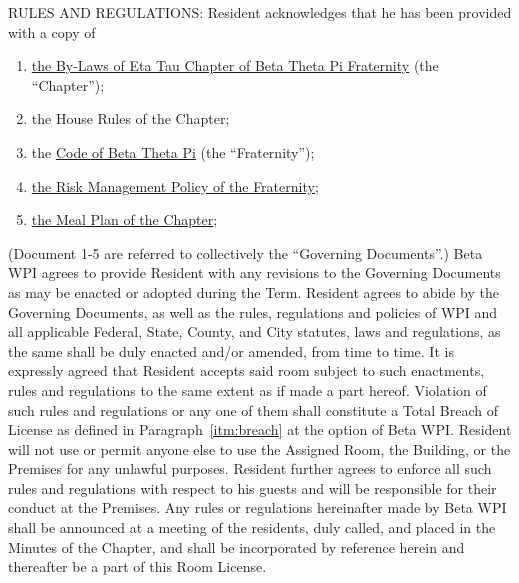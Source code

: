 \documentclass[legalpaper, 12pt]{article}
\begin{document}
\begin{enumerate}
RULES AND REGULATIONS\@: Resident acknowledges that he has been provided with a copy of 

\begin{enumerate}[label=\arabic*)]

        \item \href{https://docs.google.com/document/d/19zC4bDC3ZrdCWqLJ8Y0Z35mJEEDPLed1o6GGvX5XCGw/edit?usp=sharing} {the By-Laws of Eta Tau Chapter of Beta Theta Pi Fraternity} (the ``Chapter''); 

        \item the House Rules of the Chapter; 

        \item the \href{https://beta.org/wp-content/uploads/2020/08/Code-of-Beta-Theta-Pi_08.13.2020.pdf}{Code of Beta Theta Pi} (the ``Fraternity'');

        \item \href{https://beta.org/wp-content/uploads/2020/08/Beta-Theta-Pi-Risk-Management-Policy-August-2020.pdf}{the Risk Management Policy of the Fraternity};

        \item \href{https://docs.google.com/document/d/1TNQDLowFoC3HZo6kSRtdvaxXrOXnMxME0UXYeSga4I8/edit?usp=sharing}{the Meal Plan of the Chapter}; 

\end{enumerate} 

(Document 1-5 are referred to collectively the ``Governing Documents''.) Beta WPI agrees to provide Resident with any revisions to the Governing Documents as may be enacted or adopted during the Term.
Resident agrees to abide by the Governing Documents, as well as the rules, regulations and policies of WPI and all applicable Federal, State, County, and City statutes, laws and regulations, as the same shall be duly enacted and/or amended, from time to time.
It is expressly agreed that Resident accepts said room subject to such enactments, rules and regulations to the same extent as if made a part hereof.
Violation of such rules and regulations or any one of them shall constitute a Total Breach of License as defined in Paragraph~\ref{itm:breach} at the option of Beta WPI\@.
Resident will not use or permit anyone else to use the Assigned Room, the Building, or the Premises for any unlawful purposes.
Resident further agrees to enforce all such rules and regulations with respect to his guests and will be responsible for their conduct at the Premises.
Any rules or regulations hereinafter made by Beta WPI shall be announced at a meeting of the residents, duly called, and placed in the Minutes of the Chapter, and shall be incorporated by reference herein and thereafter be a part of this Room License.


\end{enumerate}
\end{document}
